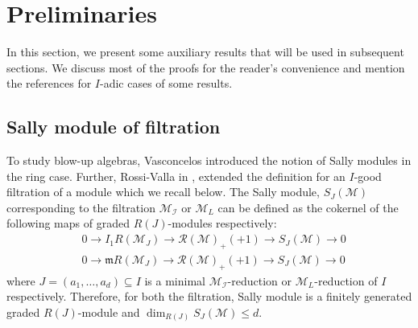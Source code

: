 \documentclass[11pt,reqno]{amsart}
\theoremstyle{definition}
\newcommand{\m}{\mathfrak m}
\def\R{{\mathcal R}}
\def\M{{\mathcal M}}
\def\I{{\mathcal I}}
\numberwithin{equation}{section}
\begin{document}
\section{Preliminaries}\label{Section-Pre}
In this section, we present some auxiliary results that will be used in subsequent sections. We discuss most of the proofs for the reader's convenience and mention the references for $I$-adic cases of some results.
\subsection{Sally module of filtration}
To study blow-up algebras, Vasconcelos \cite{Vas94} introduced the notion of Sally modules in the ring case. 
Further, Rossi-Valla in \cite[Chapter 6]{rossi-valla}, extended the definition for an $I$-good filtration of a module which we recall below. The Sally module, $S_J(\M)$ corresponding to the filtration $\M_\I$ or $\M_L$ can be defined as the cokernel of the following maps of graded $R(J)$-modules respectively:
\begin{align}\label{eq_1}
 &0\longrightarrow I_1R(\M_J)\longrightarrow \R(\M)_{+}(+1)\longrightarrow S_J(\M)\longrightarrow 0 \\
 &0\longrightarrow \m R(\M_J)\longrightarrow \R(\M)_{+}(+1)\longrightarrow S_J(\M)\longrightarrow 0
\end{align}
where $J=(a_1,\ldots,a_d)\subseteq I$ is a minimal $\M_\I$-reduction or $\M_L$-reduction  of $I$ respectively. Therefore, for both the filtration, Sally module is a finitely generated graded $R(J)$-module and $\dim_{R(J)} S_J(\M)\leq d$.  
\end{document}
